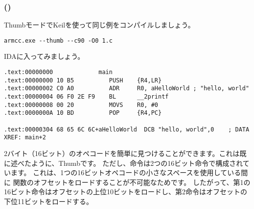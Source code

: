 \subsubsection{\NonOptimizingKeilVI (\ThumbMode)}

ThumbモードでKeilを使って同じ例をコンパイルしましょう。

\begin{lstlisting}
armcc.exe --thumb --c90 -O0 1.c 
\end{lstlisting}

IDAに入ってみましょう。

\begin{lstlisting}[caption=\NonOptimizingKeilVI (\ThumbMode) + \IDA,style=customasmARM]
.text:00000000             main
.text:00000000 10 B5          PUSH    {R4,LR}
.text:00000002 C0 A0          ADR     R0, aHelloWorld ; "hello, world"
.text:00000004 06 F0 2E F9    BL      __2printf
.text:00000008 00 20          MOVS    R0, #0
.text:0000000A 10 BD          POP     {R4,PC}

.text:00000304 68 65 6C 6C+aHelloWorld  DCB "hello, world",0    ; DATA XREF: main+2
\end{lstlisting}

2バイト（16ビット）のオペコードを簡単に見つけることができます。これは既に述べたように、Thumbです。
ただし、命令は2つの16ビット命令で構成されています。
これは、1つの16ビットオペコードの小さなスペースを使用している間に \printf 関数のオフセットをロードすることが不可能なためです。
したがって、第1の16ビット命令はオフセットの上位10ビットをロードし、第2命令はオフセットの下位11ビットをロードする。


